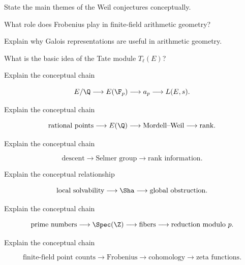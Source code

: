 \begin{exercise}[2]
State the main themes of the Weil conjectures conceptually.
\end{exercise}

\begin{exercise}[2]
What role does Frobenius play in finite-field arithmetic geometry?
\end{exercise}

\begin{exercise}[2]
Explain why Galois representations are useful in arithmetic geometry.
\end{exercise}

\begin{exercise}[2]
What is the basic idea of the Tate module \(T_\ell(E)\)?
\end{exercise}

\begin{exercise}[3]
Explain the conceptual chain

\[
E/\Q
\longrightarrow
E(\F_p)
\longrightarrow
a_p
\longrightarrow
L(E,s).
\]
\end{exercise}

\begin{exercise}[3]
Explain the conceptual chain

\[
\text{rational points}
\longrightarrow
E(\Q)
\longrightarrow
\text{Mordell--Weil}
\longrightarrow
\text{rank}.
\]
\end{exercise}

\begin{exercise}[3]
Explain the conceptual chain

\[
\text{descent}
\longrightarrow
\text{Selmer group}
\longrightarrow
\text{rank information}.
\]
\end{exercise}

\begin{exercise}[3]
Explain the conceptual relationship

\[
\text{local solvability}
\longrightarrow
\Sha
\longrightarrow
\text{global obstruction}.
\]
\end{exercise}

\begin{exercise}[3]
Explain the conceptual chain

\[
\text{prime numbers}
\longrightarrow
\Spec(\Z)
\longrightarrow
\text{fibers}
\longrightarrow
\text{reduction modulo }p.
\]
\end{exercise}

\begin{exercise}[3]
Explain the conceptual chain

\[
\text{finite-field point counts}
\longrightarrow
\text{Frobenius}
\longrightarrow
\text{cohomology}
\longrightarrow
\text{zeta functions}.
\]
\end{exercise}

